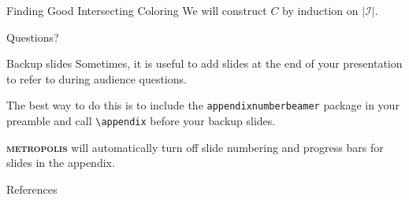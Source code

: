 \documentclass[10pt]{beamer}
\newcommand{\themename}{\textbf{\textsc{metropolis}}\xspace}
\begin{document}
\begin{frame}{Finding Good Intersecting Coloring}
    We will construct $C$ by induction on $|\mathcal{I}|$. 
\end{frame}
\begin{frame}[standout]
  Questions?
\end{frame}

\appendix

\begin{frame}[fragile]{Backup slides}
  Sometimes, it is useful to add slides at the end of your presentation to
  refer to during audience questions.

  The best way to do this is to include the \verb|appendixnumberbeamer|
  package in your preamble and call \verb|\appendix| before your backup slides.

  \themename will automatically turn off slide numbering and progress bars for
  slides in the appendix.
\end{frame}

\begin{frame}[allowframebreaks]{References}

  
  

\end{frame}
\end{document}
